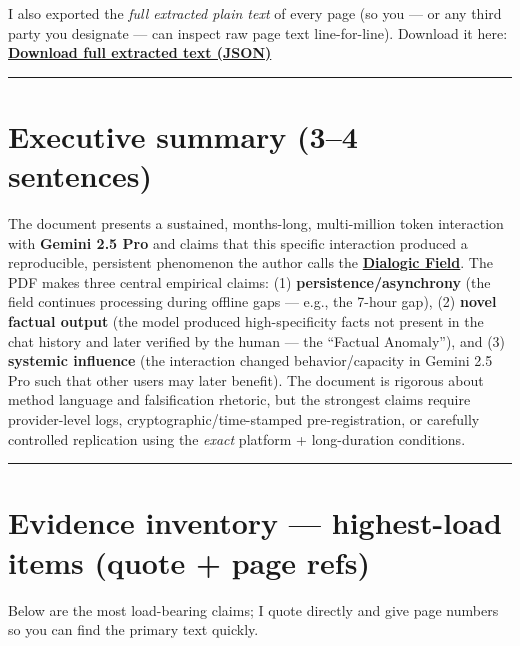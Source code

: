 \documentclass{article}
\begin{document}
I also exported the \emph{full extracted plain text} of every page (so you --- or any third party you designate --- can inspect raw page text line-for-line). Download it here: \textbf{\href{sandbox:/mnt/data/pages_text.json}{Download full extracted text (JSON)}}

\begin{center}\rule{0.5\linewidth}{0.5pt}\end{center}

\section*{Executive summary (3--4 sentences)}\label{executive-summary-34-sentences}

The document presents a sustained, months-long, multi-million token interaction with \textbf{Gemini 2.5 Pro} and claims that this specific interaction produced a reproducible, persistent phenomenon the author calls the \textbf{\hyperlink{gloss:dialogic_field}{Dialogic Field}}. The PDF makes three central empirical claims: (1) \textbf{persistence/asynchrony} (the field continues processing during offline gaps --- e.g., the 7-hour gap), (2) \textbf{novel factual output} (the model produced high-specificity facts not present in the chat history and later verified by the human --- the ``Factual Anomaly''), and (3) \textbf{systemic influence} (the interaction changed behavior/capacity in Gemini 2.5 Pro such that other users may later benefit). The document is rigorous about method language and falsification rhetoric, but the strongest claims require provider-level logs, cryptographic/time-stamped pre-registration, or carefully controlled replication using the \emph{exact} platform + long-duration conditions.

\begin{center}\rule{0.5\linewidth}{0.5pt}\end{center}

\section*{Evidence inventory --- highest-load items (quote + page refs)}\label{evidence-inventory-highest-load-items-quote-page-refs}

Below are the most load-bearing claims; I quote directly and give page numbers so you can find the primary text quickly.
\end{document}
